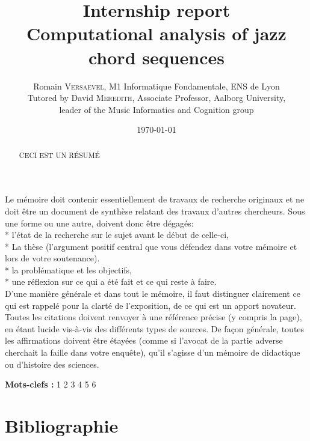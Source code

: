 \documentclass[a4paper,12pt]{article}
\title{\Large Internship report \\ \LARGE Computational analysis of jazz chord sequences}
\author{\normalsize Romain \textsc{Versaevel}, M1 Informatique Fondamentale, ENS de Lyon\\
\normalsize Tutored by David \textsc{Meredith}, Associate Professor, Aalborg University,\\
\normalsize leader of the Music Informatics and Cognition group\\}
\date{\today}
\begin{document}
\maketitle
\newpage

Le mémoire doit contenir essentiellement de travaux de recherche originaux et ne doit être un document de synthèse relatant des travaux d’autres chercheurs. Sous une forme ou une autre, doivent donc être dégagés: \\
* l’état de la recherche sur le sujet avant le début de celle-ci, \\
* La thèse (l’argument positif central que vous défendez dans votre mémoire et lors
de votre soutenance). \\
* la problématique et les objectifs, \\
* une réflexion sur ce qui a été fait et ce qui reste à faire. \\
D’une manière générale et dans tout le mémoire, il faut distinguer clairement ce qui est rappelé pour la clarté de l’exposition, de ce qui est un apport novateur. Toutes les citations doivent renvoyer à une référence précise (y compris la page), en étant lucide vis-à-vis des différents types de sources. De façon générale, toutes les affirmations doivent être étayées (comme si l’avocat de la partie adverse cherchait la faille dans votre enquête), qu’il s’agisse d’un mémoire de didactique ou d’histoire des sciences.

\newpage
\begin{abstract}
CECI EST UN RÉSUMÉ
\end{abstract}
\bigskip
\textbf{Mots-clefs :} 1 2 3 4 5 6

\newpage
\section{Bibliographie}
\printbibliography
\end{document}
